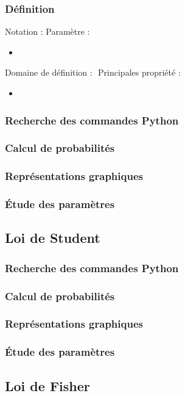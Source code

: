 \documentclass[rapport]{subfiles}
\begin{document}
	\subsubsection*{Définition}
	\noindent Notation : 
	Paramètre :\begin{itemize}[label=$\Diamond$]
		\item 
	\end{itemize}
	Domaine de définition : \(\)
	Principales propriété :\begin{itemize}[label=$\Diamond$]
		\item 
	\end{itemize}
	\subsubsection*{Recherche des commandes Python}
	\subsubsection*{Calcul de probabilités}
	\subsubsection*{Représentations graphiques}
	\subsubsection*{Étude des paramètres}
	
	\subsection{Loi de Student}
	\subsubsection*{Recherche des commandes Python}
	\subsubsection*{Calcul de probabilités}
	\subsubsection*{Représentations graphiques}
	\subsubsection*{Étude des paramètres}
	
	\subsection{Loi de Fisher}
\end{document}
